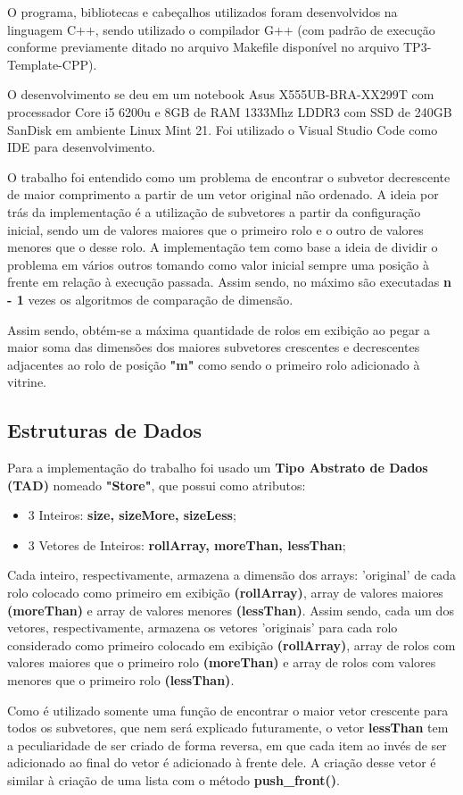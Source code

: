 \documentclass[12pt]{article}
\begin{document}
\par O programa, bibliotecas e cabeçalhos utilizados foram desenvolvidos na linguagem C++,
sendo utilizado o compilador G++ (com padrão de execução conforme previamente ditado no
arquivo Makefile disponível no arquivo TP3-Template-CPP).
\par O desenvolvimento se deu em um notebook Asus X555UB-BRA-XX299T com processador Core i5 6200u e 8GB de RAM 1333Mhz LDDR3 com SSD de 240GB SanDisk em ambiente Linux Mint 21. Foi utilizado o Visual Studio Code como IDE para desenvolvimento.
\par O trabalho foi entendido como um problema de encontrar o subvetor decrescente de maior comprimento a partir de um vetor original não ordenado. A ideia por trás da implementação é a utilização de subvetores a partir da configuração inicial, sendo um de valores maiores que o primeiro rolo e o outro de valores menores que o desse rolo. A implementação tem como base a ideia de dividir o problema em vários outros tomando como valor inicial sempre uma posição à frente em relação à execução passada. Assim sendo, no máximo são executadas \textbf{n - 1} vezes os algoritmos de comparação de dimensão.
\par Assim sendo, obtém-se a máxima quantidade de rolos em exibição ao pegar a maior soma das dimensões dos maiores subvetores crescentes e decrescentes adjacentes ao rolo de posição \textbf{"m"} como sendo o primeiro rolo adicionado à vitrine.

    \subsection{Estruturas de Dados}
    \par Para a implementação do trabalho foi usado um \textbf{Tipo Abstrato de Dados (TAD)} nomeado \textbf{"Store"}, que possui como atributos:
    \begin{itemize}
    \item 3 Inteiros: \textbf{size, sizeMore, sizeLess};
    \item 3 Vetores de Inteiros: \textbf{rollArray, moreThan, lessThan};
    \end{itemize}
    \par Cada inteiro, respectivamente, armazena a dimensão dos arrays: 'original' de cada rolo colocado como primeiro em exibição \textbf{(rollArray)}, array de valores maiores \textbf{(moreThan)} e array de valores menores \textbf{(lessThan)}. Assim sendo, cada um dos vetores, respectivamente, armazena os vetores 'originais' para cada rolo considerado como primeiro colocado em exibição \textbf{(rollArray)}, array de rolos com valores maiores que o primeiro rolo \textbf{(moreThan)} e array de rolos com valores menores que o primeiro rolo \textbf{(lessThan)}.
    \par Como é utilizado somente uma função de encontrar o maior vetor crescente para todos os subvetores, que nem será explicado futuramente, o vetor \textbf{lessThan} tem a peculiaridade de ser criado de forma reversa, em que cada item ao invés de ser adicionado ao final do vetor é adicionado à frente dele. A criação desse vetor é similar à criação de uma lista com o método \textbf{push\_front()}.
\end{document}
